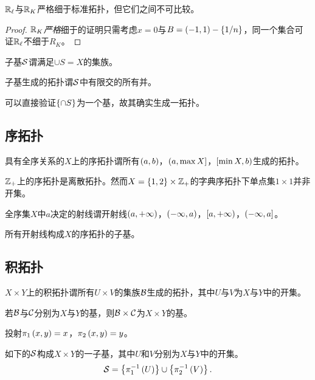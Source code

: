 \documentclass{ctexrep}
\begin{document}
  \begin{lemma}
  $\mathbb{R}_\ell$与$\mathbb{R}_K$严格细于标准拓扑，但它们之间不可比较。
  \end{lemma}
  \begin{proof}
  $\mathbb{R}_K$\emph{严格}细于的证明只需考虑$x=0$与$B=\left(-1,1\right)-\left\{1/n\right\}$，同一个集合可证$\mathbb{R}_\ell$不细于$R_K$。
  \end{proof}
  \begin{definition}
  子基$\mathcal{S}$谓满足$\cup S=X$的集族。
  \end{definition}
  \begin{definition}
  子基生成的拓扑谓$\mathcal{S}$中有限交的所有并。
  \end{definition}
  可以直接验证$\left\{\cap S\right\}$为一个基，故其确实生成一拓扑。
  \subsection{序拓扑}
  \begin{definition}
  具有全序关系的$X$上的序拓扑谓所有$\left(a,b\right)$，$\left(a,\max X\right]$，$\left[\min X, b\right)$生成的拓扑。
  \end{definition}
  \begin{ex}
  $\mathbb{Z}_+$上的序拓扑是离散拓扑。然而$X=\left\{1,2\right\}\times\mathbb{Z}_+$的字典序拓扑下单点集$1\times1$并非开集。
  \end{ex}
  \begin{definition}
  全序集$X$中$a$决定的射线谓开射线$\left(a,+\infty\right)$，$\left(-\infty,a\right)$，$\left[a,+\infty\right)$，$\left(-\infty,a\right]$。
  \end{definition}
  所有开射线构成$X$的序拓扑的子基。
  \subsection{积拓扑}
  \begin{definition}
  $X\times Y$上的积拓扑谓所有$U\times V$的集族$\mathcal{B}$生成的拓扑，其中$U$与$V$为$X$与$Y$中的开集。
  \end{definition}
  \begin{theorem}
  若$\mathcal{B}$与$\mathcal{C}$分别为$X$与$Y$的基，则$\mathcal{B}\times\mathcal{C}$为$X\times Y$的基。
  \end{theorem}
  \begin{definition}
  投射$\pi_1\left(x,y\right)=x$，$\pi_2\left(x,y\right)=y$。
  \end{definition}
  \begin{theorem}
  如下的$\mathcal{S}$构成$X\times Y$的一子基，其中$U$和$V$分别为$X$与$Y$中的开集。
  \[ \mathcal{S} = \left\{\pi_1^{-1}\left(U\right)\right\}\cup\left\{\pi_2^{-1}\left(V\right)\right\}. \]
  \end{theorem}
\end{document}
